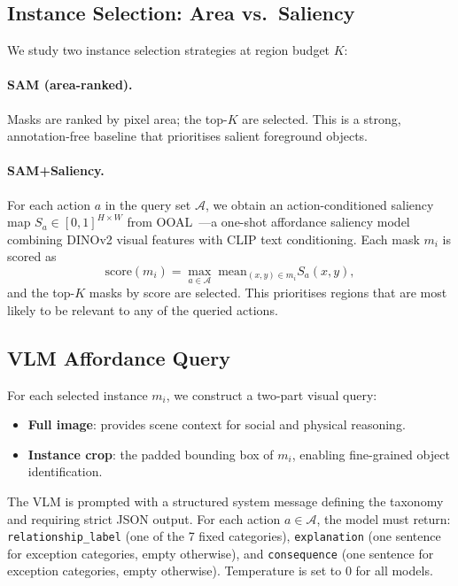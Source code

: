\documentclass[runningheads]{llncs}
\begin{document}
\subsection{Instance Selection: Area vs.\ Saliency}
\label{sec:selection}

We study two instance selection strategies at region budget $K$:

\paragraph{SAM (area-ranked).}
Masks are ranked by pixel area; the top-$K$ are selected. This is a
strong, annotation-free baseline that prioritises salient foreground
objects.

\paragraph{SAM+Saliency.}
For each action $a$ in the query set $\mathcal{A}$, we obtain an
action-conditioned saliency map $S_a \in [0,1]^{H \times W}$ from
OOAL~\cite{ooal}—a one-shot affordance saliency model combining DINOv2
visual features with CLIP text conditioning. Each mask $m_i$ is scored as
\begin{equation}
  \text{score}(m_i) = \max_{a \in \mathcal{A}} \; \text{mean}_{(x,y) \in m_i} S_a(x, y),
\end{equation}
and the top-$K$ masks by score are selected. This prioritises regions that
are most likely to be relevant to any of the queried actions.

\subsection{VLM Affordance Query}
\label{sec:prompt}

For each selected instance $m_i$, we construct a two-part visual query:
\begin{itemize}
  \item \textbf{Full image}: provides scene context for social and
    physical reasoning.
  \item \textbf{Instance crop}: the padded bounding box of $m_i$,
    enabling fine-grained object identification.
\end{itemize}

The VLM is prompted with a structured system message defining the
taxonomy and requiring strict JSON output. For each action
$a \in \mathcal{A}$, the model must return:
\texttt{relationship\_label} (one of the 7 fixed categories),
\texttt{explanation} (one sentence for exception categories, empty
otherwise), and \texttt{consequence} (one sentence for exception
categories, empty otherwise). Temperature is set to $0$ for all models.
\end{document}
